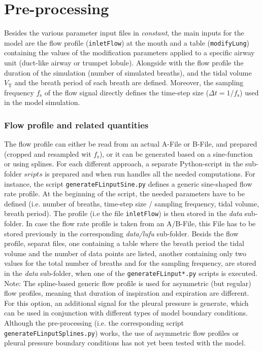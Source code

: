\section{Pre-processing} \label{sec:preprocessing}
Besides the various parameter input files in \textit{constant}, the main inputs for the model are the flow profile (\texttt{inletFlow}) at the mouth and a table (\texttt{modifyLung}) containing the values of the modification parameters applied to a specific airway unit (duct-like airway or trumpet lobule).
Alongside with the flow profile the duration of the simulation (number of simulated breaths), and the tidal volume $V_\mathrm{T}$ and the breath period of each breath are defined.
Moreover, the sampling frequency $f_\mathrm{s}$ of the flow signal directly defines the time-step size ($\Delta t = 1/f_\mathrm{s}$) used in the model simulation.

\subsubsection{Flow profile and related quantities}
The flow profile can either be read from an actual A-File or B-File, and prepared (cropped and resampled wit $f_\mathrm{s}$), or it can be generated based on a sine-function or using splines.
For each different approach, a separate Python-script in the sub-folder $\textit{sripts}$ is prepared and when run handles all the needed computations.
For instance, the script \texttt{generateFLinputSine.py} defines a generic sine-shaped flow rate profile. At the beginning of the script, the needed parameters have to be defined (i.e. number of breaths, time-step size / sampling frequency, tidal volume, breath period).
The profile (i.e the file \texttt{inletFlow}) is then stored in the \textit{data} sub-folder.
In case the flow rate profile is taken from an A/B-File, this File has to be stored previously in the corresponding \textit{data/lufu} sub-folder.
Besids the flow profile, separat files, one containing a table where the breath period the tidal volume and the number of data points are listed, another containing only two values for the total number of breaths and for the sampling frequency, are stored in the \textit{data} sub-folder, when one of the \texttt{generateFLinput*.py} scripts is executed.
Note: The spline-based generic flow profile is used for asymmetric (but regular) flow profiles, meaning that duration of inspiration and expiration are different.
For this option, an additional signal for the pleural pressure is generate, which can be used in conjunction with different types of model boundary conditions.
Although the pre-processing (i.e. the corresponding script \texttt{generateFLinputSplines.py}) works, the use of asymmetric flow profiles or pleural pressure boundary conditions has not yet been tested with the model.

